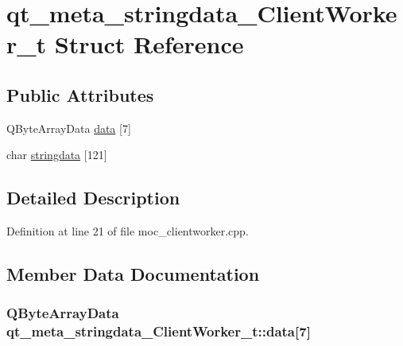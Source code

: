 \hypertarget{structqt__meta__stringdata___client_worker__t}{}\section{qt\+\_\+meta\+\_\+stringdata\+\_\+\+Client\+Worker\+\_\+t Struct Reference}
\label{structqt__meta__stringdata___client_worker__t}
\subsection*{Public Attributes}
\begin{DoxyCompactItemize}
\item 
Q\+Byte\+Array\+Data \hyperlink{structqt__meta__stringdata___client_worker__t_a857bac975d64ece43dbf2a25067785cb}{data} \mbox{[}7\mbox{]}
\item 
char \hyperlink{structqt__meta__stringdata___client_worker__t_a268ad3938620d0f0dc1a1b717fb62f2d}{stringdata} \mbox{[}121\mbox{]}
\end{DoxyCompactItemize}


\subsection{Detailed Description}


Definition at line 21 of file moc\+\_\+clientworker.\+cpp.



\subsection{Member Data Documentation}
\hypertarget{structqt__meta__stringdata___client_worker__t_a857bac975d64ece43dbf2a25067785cb}{}
\subsubsection[{data}]{\setlength{\rightskip}{0pt plus 5cm}Q\+Byte\+Array\+Data qt\+\_\+meta\+\_\+stringdata\+\_\+\+Client\+Worker\+\_\+t\+::data\mbox{[}7\mbox{]}}\label{structqt__meta__stringdata___client_worker__t_a857bac975d64ece43dbf2a25067785cb}


